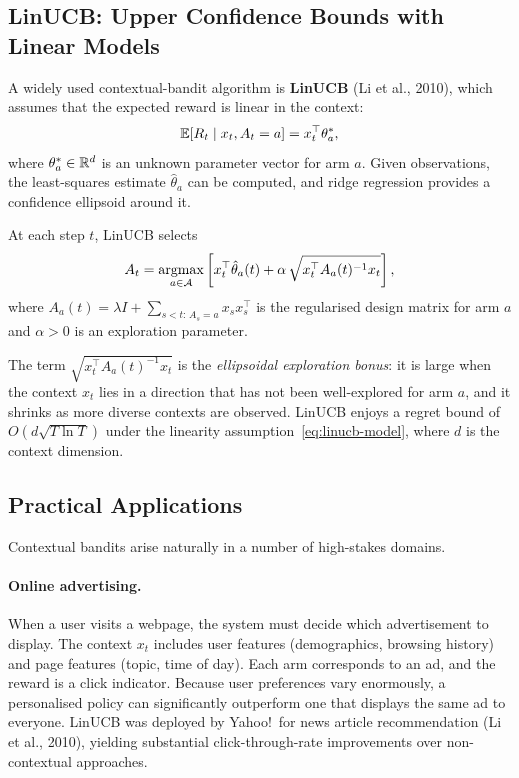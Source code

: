 \subsection*{LinUCB: Upper Confidence Bounds with Linear Models}

A widely used contextual-bandit algorithm is \textbf{LinUCB} (Li et al., 2010), which assumes that the expected reward is linear in the context:
\begin{equation}
\label{eq:linucb-model}
\operatorname{\mathbb{E}}[R_t \mid x_t, A_t=a] = x_t^\top \theta_a^*,
\end{equation}
where $\theta_a^*\in\mathbb{R}^d$ is an unknown parameter vector for arm $a$.  Given observations, the least-squares estimate $\hat\theta_a$ can be computed, and ridge regression provides a confidence ellipsoid around it.

\begin{definition}
\label{def:linucb}
At each step $t$, LinUCB selects
\begin{equation}
\label{eq:linucb}
A_t = \operatorname*{argmax}_{a\in\mathcal{A}}\left[x_t^\top\hat\theta_a(t) + \alpha\,\sqrt{x_t^\top A_a(t)^{-1}x_t}\right],
\end{equation}
where $A_a(t) = \lambda I + \sum_{s<t:\,A_s=a}x_s x_s^\top$ is the regularised design matrix for arm $a$ and $\alpha>0$ is an exploration parameter.
\end{definition}

The term $\sqrt{x_t^\top A_a(t)^{-1}x_t}$ is the \emph{ellipsoidal exploration bonus}: it is large when the context $x_t$ lies in a direction that has not been well-explored for arm $a$, and it shrinks as more diverse contexts are observed.  LinUCB enjoys a regret bound of $O(d\sqrt{T\ln T})$ under the linearity assumption~\eqref{eq:linucb-model}, where $d$ is the context dimension.

\subsection*{Practical Applications}

Contextual bandits arise naturally in a number of high-stakes domains.

\paragraph{Online advertising.}
When a user visits a webpage, the system must decide which advertisement to display.  The context $x_t$ includes user features (demographics, browsing history) and page features (topic, time of day).  Each arm corresponds to an ad, and the reward is a click indicator.  Because user preferences vary enormously, a personalised policy can significantly outperform one that displays the same ad to everyone.  LinUCB was deployed by Yahoo!\ for news article recommendation (Li et al., 2010), yielding substantial click-through-rate improvements over non-contextual approaches.

